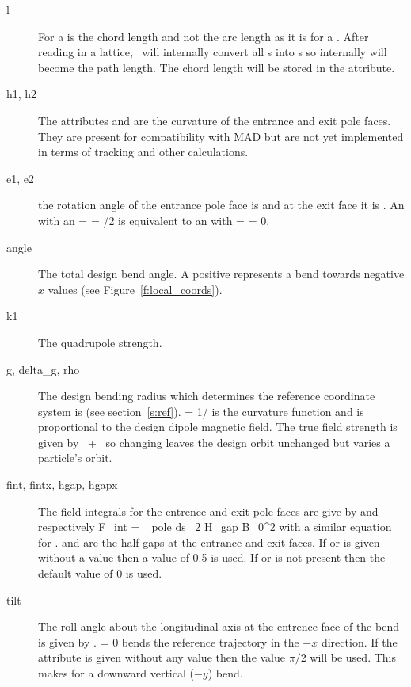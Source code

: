   \begin{description}
  \item[l]  
For a   is the chord length and not the arc length as
it is for a .  After reading in a lattice, \bmad\ will
internally convert all s into s so internally
 will become the path length. The chord length will be stored in
the  attribute.
  \item[h1, h2]
The attributes  and  are the curvature of the entrance
and exit pole faces. They are present for compatibility with MAD but
are not yet implemented in terms of tracking and other calculations.
  \item[e1, e2]
the rotation angle of the entrance pole face is  and at the exit
face it is . An  with an  =  =
/2 is equivalent to an  with  =  =
0.
  \item[angle]
The total design bend angle. A positive  represents a
bend towards negative $x$ values (see Figure~\ref{f:local_coords}).
  \item[k1]
The quadrupole strength.
  \item[g, delta\_g, rho]
The design bending radius which determines the reference coordinate
system is  (see section~\ref{s:ref}).   = 1/ is
the curvature function and is proportional to the design dipole
magnetic field. The true field strength is given by
~+~ so changing  leaves the design orbit
unchanged but varies a particle's orbit.
  \item[fint, fintx, hgap, hgapx]
The field integrals for the entrence and
exit pole faces are give by  and  respectively
\Begineq
  F_{int} = \int_{pole} \! \! ds \, 
  {2 H_{gap} B_0^2}
\Endeq
with a similar equation for .  and  are
the half gaps at the entrance and exit faces. If  or
 is given without a value then a value of 0.5 is used. If
 or  is not present then the default value of 0 is
used.
  \item[tilt]
The roll angle about the longitudinal axis at the entrence face of the
bend is given by .   = 0 bends the reference
trajectory in the $-x$ direction.  If the  attribute is given
without any value then the value $\pi/2$ will be used. This makes for
a downward vertical ($-y$) bend.
  \end{description}


